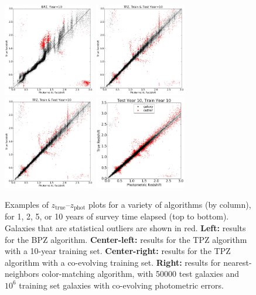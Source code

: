 \documentclass[DM,lsstdraft,toc]{lsstdoc}
\begin{document}
\begin{figure}
\begin{center}
\includegraphics[width=4.0cm]{figures/BPZ_Euclid_Y10_tzpz.png}
\includegraphics[width=4.0cm]{figures/TPZ_Euclid_10Y10_tzpz.png}
\includegraphics[width=4.0cm]{figures/TPZ_Euclid_10Y10_tzpz.png}
\includegraphics[width=4.0cm]{figures/CM_10Y10_tzpz.png}
\caption{Examples of $z_\mathrm{true}$--$z_\mathrm{phot}$ plots for a variety of algorithms (by column), for 1, 2, 5, or 10 years of survey time elapsed (top to bottom). Galaxies that are statistical outliers are shown in red. \textbf{Left:} results for the BPZ algorithm. \textbf{Center-left:} results for the TPZ algorithm with a 10-year training set. \textbf{Center-right:} results for the TPZ algorithm with a co-evolving training set. \textbf{Right:} results for nearest-neighbors color-matching algorithm, with 50000 test galaxies and $10^6$ training set galaxies with co-evolving photometric errors. \label{fig:tzpz}}
\end{center}
\end{figure}
\end{document}
